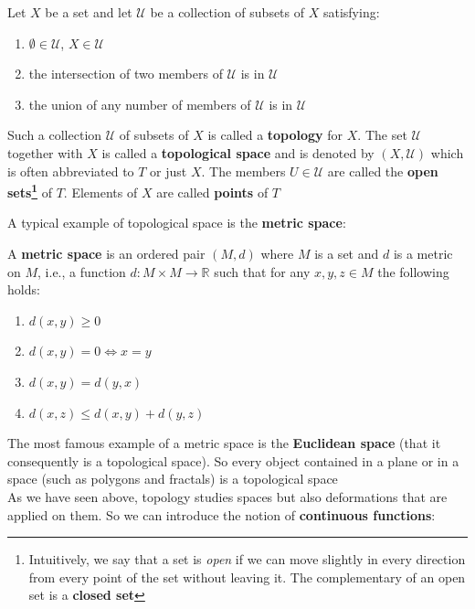 \begin{definition}
 Let $X$ be a set and let $\mathcal{U}$ be a collection of subsets of $X$ satisfying:
 \begin{enumerate}
  \item $\emptyset \in \mathcal{U}$, $X \in \mathcal{U}$
  \item the intersection of two members of $\mathcal{U}$ is in $\mathcal{U}$
  \item the union of any number of members of $\mathcal{U}$ is in $\mathcal{U}$
 \end{enumerate}
 Such a collection $\mathcal{U}$ of subsets of $X$ is called a \textbf{topology} for $X$. The set $\mathcal{U}$ together with $X$ is called a \textbf{topological space} and is denoted by $(X,\mathcal{U})$ which is often abbreviated to $T$ or just $X$. The members $U \in \mathcal{U}$ are called the \textbf{open sets\footnote{Intuitively, we say that a set is \textit{open} if we can move slightly in every direction from every point of the set without leaving it. The complementary of an open set is a \textbf{closed set}}} of $T$. Elements of $X$ are called \textbf{points} of $T$
\end{definition}

A typical example of topological space is the \textbf{metric space}:

\begin{definition}
 A \textbf{metric space} is an ordered pair $(M, d)$ where $M$ is a set and $d$ is a metric on $M$, i.e., a function $d \colon M \times M \to \mathbb{R}$ such that for any $x,y,z \in M$ the following holds:
 \begin{enumerate}
  \item $d(x,y) \ge 0$
  \item $d(x,y) = 0 \iff x = y$
  \item $d(x,y) = d(y,x)$
  \item $d(x,z) \le d(x,y) + d(y,z)$
 \end{enumerate}
\end{definition}

The most famous example of a metric space is the \textbf{Euclidean space} (that it consequently is a topological space). So every object contained in a plane or in a space (such as polygons and fractals) is a topological space\\

As we have seen above, topology studies spaces but also deformations that are applied on them. So we can introduce the notion of \textbf{continuous functions}:

